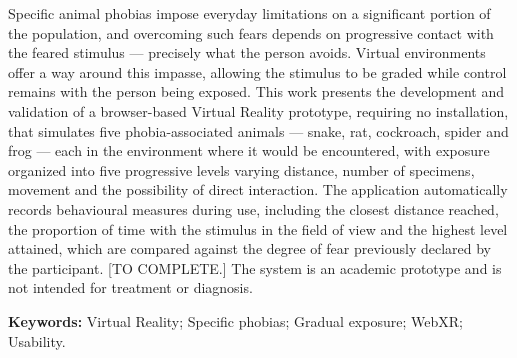 \noindent Specific animal phobias impose everyday limitations on a
significant portion of the population, and overcoming such fears depends
on progressive contact with the feared stimulus --- precisely what the
person avoids. Virtual environments offer a way around this impasse,
allowing the stimulus to be graded while control remains with the person
being exposed. This work presents the development and validation of a
browser-based Virtual Reality prototype, requiring no installation, that
simulates five phobia-associated animals --- snake, rat, cockroach,
spider and frog --- each in the environment where it would be
encountered, with exposure organized into five progressive levels varying
distance, number of specimens, movement and the possibility of direct
interaction. The application automatically records behavioural measures
during use, including the closest distance reached, the proportion of
time with the stimulus in the field of view and the highest level
attained, which are compared against the degree of fear previously
declared by the participant. [TO COMPLETE.] The system is an academic
prototype and is not intended for treatment or diagnosis.

\vspace{0.4cm}
\noindent\textbf{Keywords:} Virtual Reality; Specific phobias; Gradual
exposure; WebXR; Usability.
\endgroup
\newpage
